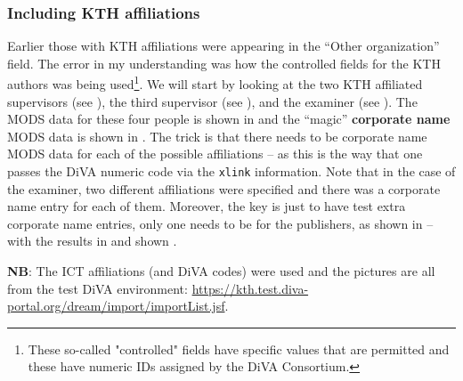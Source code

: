 \FloatBarrier

\subsubsection{Including KTH affiliations}
Earlier those with KTH affiliations were appearing in the “Other organization” field. The error in my understanding was how the controlled fields for the KTH authors was being used\footnote{These so-called "controlled" fields have specific values that are permitted and these have numeric IDs assigned by the DiVA Consortium.}. We will start by looking at the two KTH affiliated supervisors (see ), the third supervisor (see ), and the examiner (see ). The MODS data for these four people is shown in  and the “magic” \textbf{corporate name} MODS data is shown in . The trick is that there needs to be corporate name MODS data for each of the possible affiliations – as this is the way that one passes the DiVA numeric code via the \texttt{xlink} information. Note that in the case of the examiner, two different affiliations were specified and there was a corporate name entry for each of them. Moreover, the key is just to have test extra corporate name entries, only one needs to be for the publishers, as shown in  – with the results in  and shown .

\textbf{NB}: The ICT affiliations (and DiVA codes) were used and the pictures are all from the test DiVA environment: \url{https://kth.test.diva-portal.org/dream/import/importList.jsf}.

